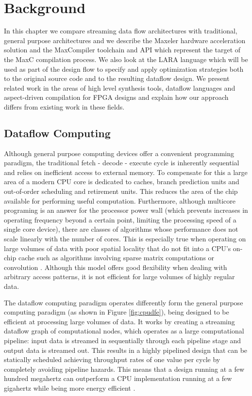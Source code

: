 \chapter{Background}

In this chapter we compare streaming data flow architectures with
traditional, general purpose architectures and we describe the Maxeler
hardware acceleration solution and the MaxCompiler toolchain and API
which represent the target of the MaxC compilation process. We also
look at the LARA language which will be used as part of the design
flow to specify and apply optimization strategies both to the original
source code and to the resulting dataflow design. We present related
work in the areas of high level synthesis tools, dataflow languages
and aspect-driven compilation for FPGA designs and explain how our
approach differs from existing work in these fields.

\section{Dataflow Computing}

Although general purpose computing devices offer a convenient
programming paradigm, the traditional fetch - decode - execute cycle
is inherently sequential and relies on inefficient access to external
memory. To compensate for this a large area of a modern CPU core is
dedicated to caches, branch prediction units and out-of-order
scheduling and retirement units. This reduces the area of the chip
available for performing useful computation. Furthermore, although
multicore programing is an answer for the processor power wall (which
prevents increases in operating frequency beyond a certain point,
limiting the processing speed of a single core device), there are
classes of algorithms whose performance does not scale linearly with
the number of cores. This is especially true when operating on large
volumes of data with poor spatial locality that do not fit into a
CPU's on-chip cache such as algorithms involving sparse matrix
computations or convolution
\cite{Lindjtorn:Clapp:Pell:Mencer:Flynn:2010}. Although this model
offers good flexibility when dealing with arbitrary access patterns,
it is not efficient for large volumes of highly regular data.

The dataflow computing paradigm operates differently form the general
purpose computing paradigm (as shown in Figure \ref{fig:cpudfe}),
being designed to be efficient at processing large volumes of data. It
works by creating a streaming dataflow graph of computational nodes,
which operates as a large computational pipeline: input data is
streamed in sequentially through each pipeline stage and output data
is streamed out. This results in a highly pipelined design that can be
statically scheduled achieving throughput rates of one value per cycle
by completely avoiding pipeline hazards. This means that a design
running at a few hundred megahertz can outperform a CPU implementation
running at a few gigahertz while being more energy efficient
\cite{Pell:Mencer:2011}.


